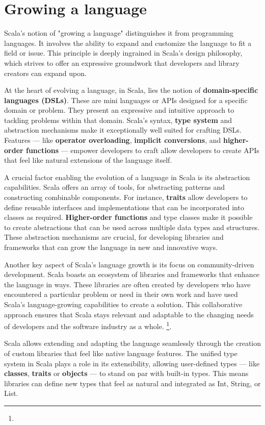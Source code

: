 \section{Growing a language}

Scala's notion of "growing a language" distinguishes it from programming languages. It involves the ability to expand and customize the language to fit a field or issue. This principle is deeply ingrained in Scala's design philosophy, which strives to offer an expressive groundwork that developers and library creators can expand upon\footnotemark[2].

At the heart of evolving a language, in Scala, lies the notion of \textbf{domain-specific languages (DSLs)}. These are mini languages or APIs designed for a specific domain or problem. They present an expressive and intuitive approach to tackling problems within that domain. Scala's syntax, \textbf{type system} and abstraction mechanisms make it exceptionally well suited for crafting DSLs. Features  — like \textbf{operator overloading}, \textbf{implicit conversions}, and \textbf{higher-order functions} — empower developers to craft allow developers to create APIs that feel like natural extensions of the language itself\footnotemark[2].

A crucial factor enabling the evolution of a language in Scala is its abstraction capabilities. Scala offers an array of tools, for abstracting patterns and constructing combinable components. For instance, \textbf{traits} allow developers to define reusable interfaces and implementations that can be incorporated into classes as required. \textbf{Higher-order functions} and type classes make it possible to create abstractions that can be used across multiple data types and structures. These abstraction mechanisms are crucial, for developing libraries and frameworks that can grow the language in new and innovative ways\footnotemark[2].

Another key aspect of Scala's language growth is its focus on community-driven development. Scala boasts an ecosystem of libraries and frameworks that enhance the language in ways. These libraries are often created by developers who have encountered a particular problem or need in their own work and have used Scala's language-growing capabilities to create a solution. This collaborative approach ensures that Scala stays relevant and adaptable to the changing needs of developers and the software industry as a whole. \footnote[2]{}.

Scala allows extending and adapting the language seamlessly through the creation of custom libraries that feel like native language features. The unified type system in Scala plays a role in its extensibility, allowing user-defined types — like  \textbf{classes}, \textbf{traits} or \textbf{objects} — to stand on par with built-in types. This means libraries can define new types that feel as natural and integrated as Int, String, or List\footnotemark[3].

